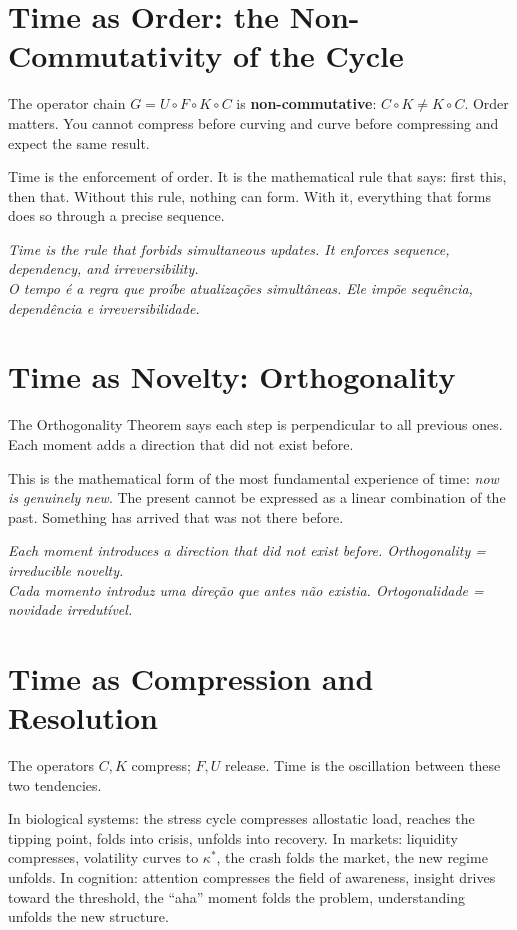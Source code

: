 \documentclass[12pt, openright]{book}
\newcommand{\bilingualq}[2]{%
  \begin{center}
  \begin{minipage}{0.85\textwidth}
  \small\color{beastblue}\itshape #1\\[0.3em]
  \color{gray}\itshape #2
  \end{minipage}
  \end{center}
}
\theoremstyle{definition}
\theoremstyle{remark}
\begin{document}
\section{Time as Order: the Non-Commutativity of the Cycle}

The operator chain $G = U \circ F \circ K \circ C$ is
\textbf{non-commutative}: $C \circ K \neq K \circ C$.
Order matters. You cannot compress before curving and
curve before compressing and expect the same result.

Time is the enforcement of order. It is the mathematical
rule that says: first this, then that. Without this rule,
nothing can form. With it, everything that forms does so
through a precise sequence.

\bilingualq{%
Time is the rule that forbids simultaneous updates.
It enforces sequence, dependency, and irreversibility.
}{%
O tempo é a regra que proíbe atualizações simultâneas.
Ele impõe sequência, dependência e irreversibilidade.}

\section{Time as Novelty: Orthogonality}

The Orthogonality Theorem says each step is perpendicular
to all previous ones. Each moment adds a direction that
did not exist before.

This is the mathematical form of the most fundamental
experience of time: \textit{now is genuinely new}.
The present cannot be expressed as a linear combination
of the past. Something has arrived that was not there before.

\bilingualq{%
Each moment introduces a direction that did not exist before.
Orthogonality = irreducible novelty.
}{%
Cada momento introduz uma direção que antes não existia.
Ortogonalidade = novidade irredutível.}

\section{Time as Compression and Resolution}

The operators $C, K$ compress; $F, U$ release. Time is the
oscillation between these two tendencies.

In biological systems: the stress cycle compresses allostatic
load, reaches the tipping point, folds into crisis, unfolds
into recovery. In markets: liquidity compresses, volatility
curves to $\kappa^*$, the crash folds the market, the new
regime unfolds. In cognition: attention compresses the field
of awareness, insight drives toward the threshold, the
``aha'' moment folds the problem, understanding unfolds
the new structure.
\end{document}
